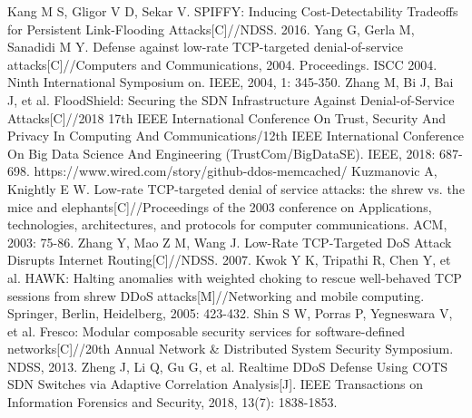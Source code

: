 \documentclass[conference]{IEEEtran}
\begin{document}
\begin{thebibliography}{00}
 Kang M S, Gligor V D, Sekar V. SPIFFY: Inducing Cost-Detectability Tradeoffs for Persistent Link-Flooding Attacks[C]//NDSS. 2016.
 Yang G, Gerla M, Sanadidi M Y. Defense against low-rate TCP-targeted denial-of-service attacks[C]//Computers and Communications, 2004. Proceedings. ISCC 2004. Ninth International Symposium on. IEEE, 2004, 1: 345-350.
 Zhang M, Bi J, Bai J, et al. FloodShield: Securing the SDN Infrastructure Against Denial-of-Service Attacks[C]//2018 17th IEEE International Conference On Trust, Security And Privacy In Computing And Communications/12th IEEE International Conference On Big Data Science And Engineering (TrustCom/BigDataSE). IEEE, 2018: 687-698.
 https://www.wired.com/story/github-ddos-memcached/
 Kuzmanovic A, Knightly E W. Low-rate TCP-targeted denial of service attacks: the shrew vs. the mice and elephants[C]//Proceedings of the 2003 conference on Applications, technologies, architectures, and protocols for computer communications. ACM, 2003: 75-86.
 Zhang Y, Mao Z M, Wang J. Low-Rate TCP-Targeted DoS Attack Disrupts Internet Routing[C]//NDSS. 2007.
 Kwok Y K, Tripathi R, Chen Y, et al. HAWK: Halting anomalies with weighted choking to rescue well-behaved TCP sessions from shrew DDoS attacks[M]//Networking and mobile computing. Springer, Berlin, Heidelberg, 2005: 423-432.
 Shin S W, Porras P, Yegneswara V, et al. Fresco: Modular composable security services for software-defined networks[C]//20th Annual Network \& Distributed System Security Symposium. NDSS, 2013.
 Zheng J, Li Q, Gu G, et al. Realtime DDoS Defense Using COTS SDN Switches via Adaptive Correlation Analysis[J]. IEEE Transactions on Information Forensics and Security, 2018, 13(7): 1838-1853.


\end{thebibliography}
\end{document}
